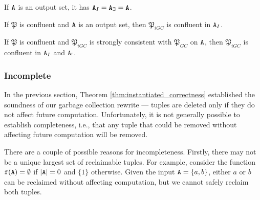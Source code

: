
\begin{cor}
\label{cor:instantiated_equivalence_of_output}
If $\tt{A}$ is an output set, it has $\tt{A}_I = \tt{A}_\exists = \tt{A}$.
\end{cor}

\begin{cor}
\label{cor:instantiated_confluence_of_output}
If $\mathfrak{P}$ is confluent and $\tt{A}$ is an output set, then $\mathfrak{P}_{iGC}$ is confluent in $\tt{A}_I$.
\end{cor}

\begin{cor}
\label{cor:instantiated_confluence_of_keys}
If $\mathfrak{P}$ is confluent and $\mathfrak{P}_{iGC}$ is strongly consistent with $\mathfrak{P}_{GC}$ on $\tt{A}$, then $\mathfrak{P}_{iGC}$ is confluent in $\tt{A}_I$ and $\tt{A}_!$.
\end{cor}

\subsubsection{Incomplete}
In the previous section, Theorem \ref{thm:instantiated_correctness} established the soundness of our garbage collection rewrite --- tuples are deleted only if they do not affect future computation.
Unfortunately, it is not generally possible to establish completeness, i.e., that any tuple that could be removed without affecting future computation will be removed.

There are a couple of possible reasons for incompleteness.
Firstly, there may not be a unique largest set of reclaimable tuples.
For example, consider the function $\tt{f}(\tt{A}) = \emptyset$ if $|\tt{A}| = 0$ and $\{1\}$ otherwise.
Given the input $\tt{A} = \{a,b\}$, either $a$ or $b$ can be reclaimed without affecting computation, but we cannot safely reclaim both tuples.

